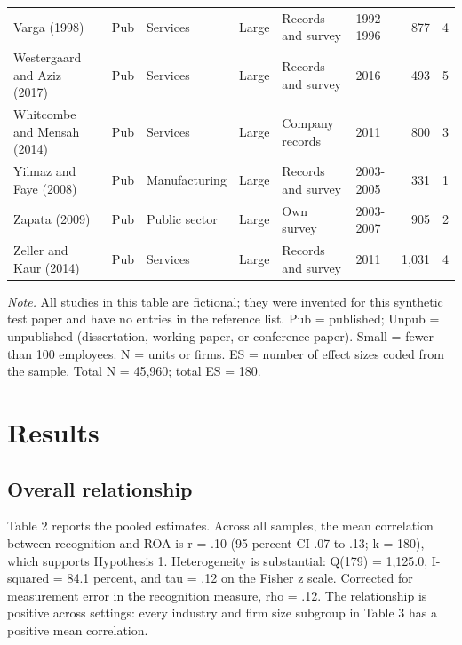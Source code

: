 \documentclass[11pt]{article}
\begin{document}
{\begin{longtable}{llllllrr}
Varga (1998) & Pub & Services & Large & Records and survey & 1992-1996 & 877 & 4 \\
Westergaard and Aziz (2017) & Pub & Services & Large & Records and survey & 2016 & 493 & 5 \\
Whitcombe and Mensah (2014) & Pub & Services & Large & Company records & 2011 & 800 & 3 \\
Yilmaz and Faye (2008) & Pub & Manufacturing & Large & Records and survey & 2003-2005 & 331 & 1 \\
Zapata (2009) & Pub & Public sector & Large & Own survey & 2003-2007 & 905 & 2 \\
Zeller and Kaur (2014) & Pub & Services & Large & Records and survey & 2011 & 1,031 & 4 \\
\end{longtable}
\vspace{-1.2em}
\noindent \textit{Note.} All studies in this table are fictional; they were invented for this synthetic test paper and have no entries in the reference list. Pub = published; Unpub = unpublished (dissertation, working paper, or conference paper). Small = fewer than 100 employees. N = units or firms. ES = number of effect sizes coded from the sample. Total N = 45,960; total ES = 180.
\par}

\section{Results}

\subsection{Overall relationship}

Table 2 reports the pooled estimates. Across all samples, the mean correlation between recognition and ROA is r = .10 (95 percent CI .07 to .13; k = 180), which supports Hypothesis 1. Heterogeneity is substantial: Q(179) = 1,125.0, I-squared = 84.1 percent, and tau = .12 on the Fisher z scale. Corrected for measurement error in the recognition measure, rho = .12. The relationship is positive across settings: every industry and firm size subgroup in Table 3 has a positive mean correlation.
\end{document}
